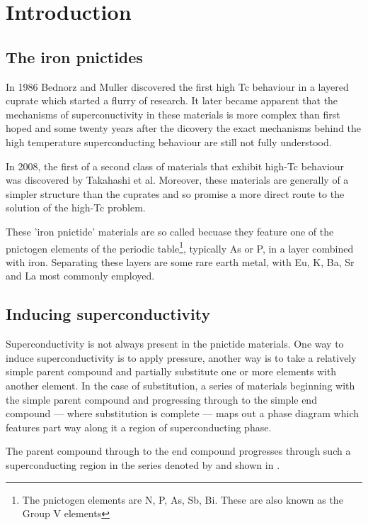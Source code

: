 \section{Introduction}

\subsection{The iron pnictides}

In 1986 Bednorz and Muller discovered the first high Tc behaviour in a layered cuprate\cite{Bednorz} which started a flurry of research. It later became apparent that the mechanisms of superconuctivity in these materials is more complex than first hoped and some twenty years after the dicovery the exact mechanisms behind the high temperature superconducting behaviour are still not fully understood.

In 2008, the first of a second class of materials that exhibit high-Tc behaviour was discovered by Takahashi et al\cite{Takahashi2008}. Moreover, these materials are generally of a simpler structure than the cuprates and so promise a more direct route to the solution of the high-Tc problem.

These 'iron pnictide' materials are so called becuase they feature one of the pnictogen elements of the periodic table\footnote{The pnictogen elements are N, P, As, Sb, Bi. These are also known as the Group V elements}, typically As or P, in a layer combined with iron. Separating these layers are some rare earth metal, with Eu, K, Ba, Sr and La most commonly employed.

\subsection{Inducing superconductivity}

Superconductivity is not always present in the pnictide materials. One way to induce superconductivity is to apply pressure, another way is to take a relatively simple parent compound and partially substitute one or more elements with another element. In the case of substitution, a series of materials beginning with the simple parent compound and progressing through to the simple end compound --- where substitution is complete --- maps out a phase diagram which features part way along it a region of superconducting phase.

The parent compound \BaFeP through to the end compound \BaFeAs progresses through such a superconducting region\cite{Kasahara2009, Jiang2009} in the series denoted by \BaFePAs and shown in \fig\cite{Figure:PhaseDiagram:Jiang2009}.

